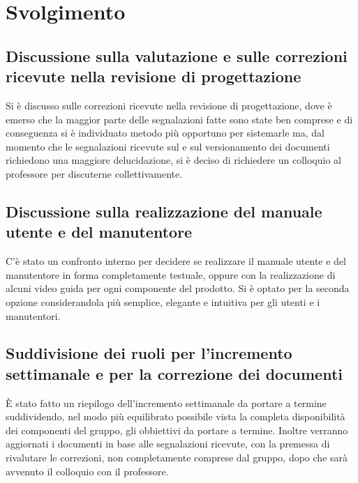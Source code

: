 \newpage
\section*{Svolgimento}

	\subsection*{Discussione sulla valutazione e sulle correzioni ricevute nella revisione di progettazione}
		Si è discusso sulle correzioni ricevute nella revisione di progettazione, dove è emerso che la maggior parte delle segnalazioni fatte sono state ben comprese e di conseguenza si è individuato metodo più opportuno per sistemarle ma, dal momento che le segnalazioni ricevute sul  e sul versionamento dei documenti richiedono una maggiore delucidazione, si è deciso di richiedere un colloquio al professore per discuterne collettivamente. 

	\subsection*{Discussione sulla realizzazione del manuale utente e del manutentore}
		C'è stato un confronto interno per decidere se realizzare il manuale utente e del manutentore in forma completamente testuale, oppure con la realizzazione di alcuni video guida per ogni componente del prodotto. Si è optato per la seconda opzione considerandola più semplice, elegante e intuitiva per gli utenti e i manutentori. 
		
	\subsection*{Suddivisione dei ruoli per l'incremento settimanale e per la correzione dei documenti}
		È stato fatto un riepilogo dell'incremento settimanale da portare a termine suddividendo, nel modo più equilibrato possibile vista la completa disponibilità dei componenti del gruppo, gli obbiettivi da portare a termine. Inoltre verranno aggiornati i documenti in base alle segnalazioni ricevute, con la premessa di rivalutare le correzioni, non completamente comprese dal gruppo, dopo che sarà avvenuto il colloquio con il professore.